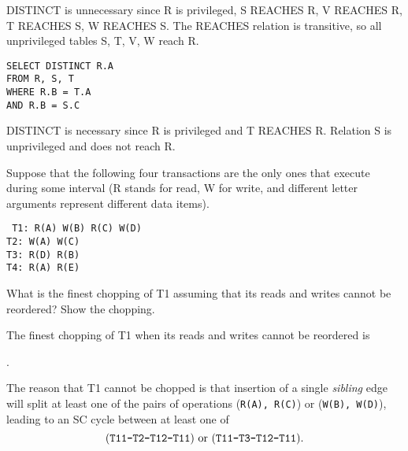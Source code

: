 \documentclass[letterpaper]{article}%
\begin{document}
\begin{enumerate}[1.]
\begin{enumerate}[a.]
        DISTINCT is unnecessary since R is privileged, S REACHES R, V REACHES
        R, T REACHES S, W REACHES S. The REACHES relation is transitive, so all
        unprivileged tables S, T, V, W reach R.

        \begin{problemcopy}
        \item \texttt{SELECT DISTINCT R.A \\
            FROM R, S, T \\
            WHERE R.B = T.A \\
            AND R.B = S.C}
        \end{problemcopy}

        DISTINCT is necessary since R is privileged and T REACHES R. Relation S
        is unprivileged and does not reach R.

    \end{enumerate}

    \begin{problemcopy} \item Suppose that the following four transactions are
        the only ones that execute during some interval (R stands for read, W
        for write, and different letter arguments represent different data
        items).

        \texttt{%
          T1: R(A) W(B) R(C) W(D) \\
          T2: W(A) W(C) \\
          T3: R(D) R(B) \\
          T4: R(A) R(E)%
        }
    \end{problemcopy}

    \begin{enumerate}[a.]
        \begin{problemcopy}
        \item What is the finest chopping of T1 assuming that its reads and
          writes cannot be reordered? Show the chopping.
        \end{problemcopy}

        The finest chopping of T1 when its reads and writes cannot be reordered
        is

        \begin{center}
          \hspace{1mm}.
        \end{center}
        \vspace{1em}

        The reason that T1 cannot be chopped is that insertion of a single
        \textsl{sibling} edge will split at least one of the pairs of
        operations (\texttt{R(A), R(C)}) or (\texttt{W(B), W(D)}), leading to
        an SC cycle between at least one of
        \begin{equation*}
          \text{(\texttt{T11--T2--T12--T11}) or (\texttt{T11--T3--T12--T11}).}
        \end{equation*}


\end{enumerate}
\end{enumerate}
\end{document}
